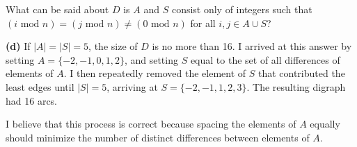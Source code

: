 \documentclass[12pt]{article}
\begin{document}
What can be said about $D$ is $A$ and $S$ consist only of integers such that $(i \text{~mod~} n) = (j \text{~mod~} n) \neq (0 \text{~mod~} n)$ for all $i,j \in A \cup S$?

\textbf{(d)} If $|A| = |S| = 5$, the size of $D$ is no more than 16. I arrived at this answer by setting $A=\{-2,-1,0,1,2\}$, and setting $S$ equal to the set of all differences of elements of $A$. I then repeatedly removed the element of $S$ that contributed the least edges until $|S|=5$, arriving at $S=\{-2,-1,1,2,3\}$. The resulting digraph had 16 arcs.

I believe that this process is correct because spacing the elements of $A$ equally should minimize the number of distinct differences between elements of $A$.
\end{document}
